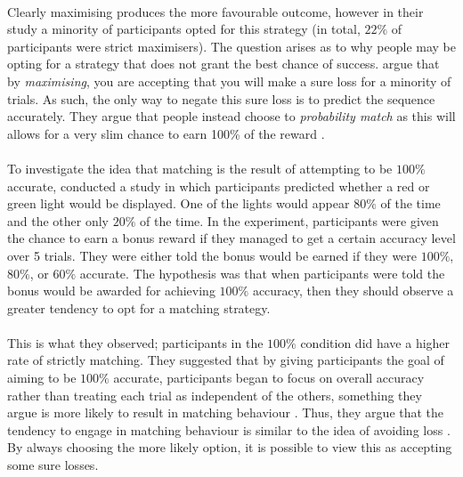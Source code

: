\documentclass[12pt]{article}
\begin{document}
\paragraph{} Clearly maximising produces the more favourable outcome, however in their study \citep{Koehler2010} a minority of participants opted for this strategy (in total, $22\%$ of participants were strict maximisers). The question arises as to why people may be opting for a strategy that does not grant the best chance of success. \cite{Gao2015} argue that by \textit{maximising}, you are accepting that you will make a sure loss for a minority of trials. As such, the only way to negate this sure loss is to predict the sequence accurately. They argue that people instead choose to \textit{probability match} as this will allows for a very slim chance to earn 100\% of the reward \citep{Gao2015}. 

\paragraph{} To investigate the idea that matching is the result of attempting to be $100\%$ accurate, \cite{Gao2015} conducted a study in which participants predicted whether a red or green light would be displayed. One of the lights would appear $80\%$ of the time and the other only $20\%$ of the time. In the experiment, participants were given the chance to earn a bonus reward if they managed to get a certain accuracy level over 5 trials. They were either told the bonus would be earned if they were $100\%$, $80\%$, or $60\%$ accurate. The hypothesis was that when participants were told the bonus would be awarded for achieving $100\%$ accuracy, then they should observe a greater tendency to opt for a matching strategy. 

\paragraph{} This is what they observed; participants in the $100\%$ condition did have a higher rate of strictly matching. They suggested that by giving participants the goal of aiming to be $100\%$ accurate, participants began to focus on overall accuracy rather than treating each trial as independent of the others, something they argue is more likely to result in matching behaviour \citep{Gao2015}. Thus, they argue that the tendency to engage in matching behaviour is similar to the idea of avoiding loss \citep{KahnemanProspect}. By always choosing the more likely option, it is possible to view this as accepting some sure losses.
\end{document}
